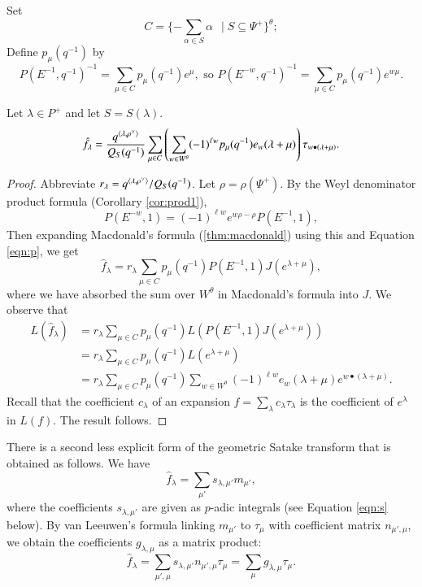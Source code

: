 Set
\[
C = \{  - \sum_{\alpha\in S}\alpha \ \ \mid S \subseteq \Psi^+ \}^\theta;
\]
Define $p_\mu(q^{-1})$ by
\begin{equation}\label{eqn:p}
 P(E^{-1},q^{-1})^{-1} = \sum_{\mu\in C} p_\mu(q^{-1}) e^{\mu},
\text{\ \ so }  P(E^{-w},q^{-1})^{-1} 
= \sum_{\mu\in C} p_\mu(q^{-1}) e^{w\mu}.
\end{equation}

\begin{theorem}\label{thm:gs}  
Let $\lambda\in P^+$ and let $S=S(\lambda)$.
\[
\hat f_\lambda = \frac{q^{\langle{\lambda,\rho^\vee}\rangle}}{Q_S(q^{-1})} 
\sum_{\mu\in C}\left(\sum_{w\in W^\theta} 
(-1)^{\ell w} p_{\mu}(q^{-1}) e_w(\lambda+\mu)\right)  
\tau_{w\bullet(\lambda+\mu)}.
\]
\end{theorem}

\begin{proof}
  Abbreviate $r_\lambda = q^{\langle{\lambda,\rho^\vee}\rangle}/Q_S(q^{-1})$.
  Let $\rho=\rho(\Psi^+)$.
  By the Weyl denominator product formula (Corollary \ref{cor:prod1}),
\begin{equation}
P(E^{-w},1) = (-1)^{\ell w} e^{w\rho - \rho} P(E^{-1},1),
\end{equation}
Then expanding Macdonald's formula (\ref{thm:macdonald}) using this
and Equation \ref{eqn:p}, we get
\[
\hat f_\lambda = r_\lambda \sum_{\mu\in C} 
p_\mu(q^{-1}) P(E^{-1},1) J (e^{\lambda+\mu}),
\]
where we have absorbed the sum over $W^\theta$ in Macdonald's formula
into $J$.  We observe that
\begin{align*}
L(\hat f_\lambda) &= r_\lambda 
\sum_{\mu\in C} p_\mu(q^{-1}) L(P(E^{-1},1) J(e^{\lambda+\mu})) \\
&= 
r_\lambda \sum_{\mu\in C} p_\mu(q^{-1}) L(e^{\lambda+\mu}) \\
&= 
r_\lambda
\sum_{\mu\in C} p_\mu(q^{-1}) 
\sum_{w\in W^\theta} (-1)^{\ell w} e_w(\lambda+\mu) e^{w\bullet (\lambda+\mu)}.
\end{align*}
Recall that the coefficient $c_\lambda$ of an expansion $f =
\sum_\lambda c_\lambda\tau_\lambda$ is the coefficient of $e^\lambda$
in $L(f)$.  The result follows.
\end{proof}

There is a second less explicit form of the geometric Satake transform
that is obtained as follows.  We have
\[
\hat f_\lambda = \sum_{\mu'} s_{\lambda,\mu'} m_{\mu'},
\]
where the coefficients $s_{\lambda,\mu'}$ are given as $p$-adic
integrals (see Equation \ref{eqn:s} below).  By van Leeuwen's formula
linking $m_{\mu'}$ to $\tau_\mu$ with coefficient matrix
$n_{\mu',\mu}$, we obtain the coefficients $g_{\lambda,\mu}$ as a
matrix product:
\begin{equation}
\hat f_\lambda 
= \sum_{\mu',\mu} s_{\lambda,\mu'} n_{\mu',\mu}
\tau_{\mu} 
= \sum_{\mu} g_{\lambda,\mu} \tau_\mu.
\end{equation}

